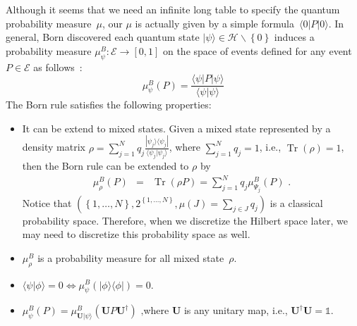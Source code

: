 \documentclass{article}
\theoremstyle{remark}
\newcommand{\qevents}{\ensuremath{\mathcal{E}}}
\newcommand{\pmeas}{\ensuremath{\mu}}
\newcommand{\Hilb}{\mathcal{H}}
\newcommand{\ket}[1]{|#1\rangle}
\newcommand{\ip}[2]{\langle #1 | #2 \rangle}
\newcommand{\proj}[1]{|#1 \rangle\langle #1 |}
\newcommand{\amr}[1]{\fbox{\begin{minipage}{0.9\textwidth}\color{green}{Amr says: #1}\end{minipage}}}
\newcommand{\melement}[2]{ \langle #1 | #2 | #1 \rangle}
\newcommand{\Tr}{\mathop{\mathrm{Tr}}\nolimits}
\begin{document}
\amr{the rest needs cleaning up and perhaps does not even belong in
  this section}

Although it seems that we need an infinite long table to specify the
quantum probability measure~$\mu$, our $\mu$ is actually
given by a simple formula~$\melement{0}{P}$. In general, Born discovered
each quantum state $\ket{\psi}\in\Hilb\backslash\left\{ 0\right\} $
induces a probability measure $\mu^B_{\psi}:\qevents\rightarrow[0,1]$
on the space of events defined for any event $P\in\qevents$ as follows~\cite{Born1983,Mermin2007}:
\begin{equation}
\mu^B_{\psi}(P)=\frac{\melement{\psi}{P}}{\ip{\psi}{\psi}}\label{eq:Born}
\end{equation}
The Born rule satisfies the following properties:
\begin{itemize}
\item It can be extend to mixed states. Given a mixed state represented
by a density matrix $\rho=\sum_{j=1}^{N}q_{j}\frac{\proj{\psi_{j}}}{\ip{\psi_{j}}{\psi_{j}}}$,
where $\sum_{j=1}^{N}q_{j}=1$, i.e., $\Tr\left(\rho\right)=1$, then
the Born rule can be extended to $\rho$ by 
\begin{eqnarray}
\mu^B_{\rho}\left(P\right) & = & \Tr\left(\rho P\right)=\sum_{j=1}^{N}q_{j}\mu^B_{\Psi_{j}}\left(P\right)\textrm{ .}\label{BornRule.mixed}
\end{eqnarray}
Notice that $\left(\left\{ 1,\ldots,N\right\} ,2^{\left\{ 1,\ldots,N\right\} },\pmeas\left(J\right)=\sum_{j\in J}q_{j}\right)$
is a classical probability space. Therefore, when we discretize the
Hilbert space later, we may need to discretize this probability space
as well.
\item $\mu^B_{\rho}$ is a probability measure for all mixed state~$\rho$.
\item $\ip{\psi}{\phi}=0\Leftrightarrow\mu^B_{\psi}\left(\proj{\phi}\right)=0$.
\item $\mu^B_{\psi}\left(P\right)=\mu^B_{\mathbf{U}\ket{\psi}}\left(\mathbf{U}P\mathbf{U}^{\dagger}\right)\textrm{ ,}$where
$\mathbf{U}$ is any unitary map, i.e., $\mathbf{U}^{\dagger}\mathbf{U}=\mathbb{1}$. 
\end{itemize}
\end{document}
